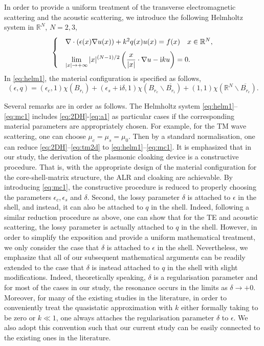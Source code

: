\documentclass[11pt,reqno,twoside]{amsart}
\theoremstyle{definition}
\theoremstyle{remark}
\numberwithin{equation}{section}
\begin{document}
In order to provide a uniform treatment of the transverse electromagnetic scattering and the acoustic scattering, we introduce the following Helmholtz system in $\mathbb{R}^N$, $N=2, 3$,
\begin{equation}\label{eq:helm1}
\begin{cases}
&\nabla\cdot(\epsilon(x)\nabla u(x))+k^2 q(x) u(x)=f(x)\quad x\in\mathbb{R}^N,\medskip\\
&\displaystyle{\lim_{|x|\rightarrow+\infty} |x|^{(N-1)/2}\left(\frac{x}{|x|}\cdot\nabla u-\mathrm{i} k u  \right)=0}.
\end{cases}
\end{equation}
In \eqref{eq:helm1}, the material configuration is specified as follows,
\begin{equation}\label{eq:mc1}
(\epsilon,q)=(\epsilon_c,1)\chi(B_{r_i})+(\epsilon_s+\mathrm{i}\delta, 1)\chi(B_{r_e}\backslash\overline{B_{r_i}})+(1, 1)\chi(\mathbb{R}^N\backslash\overline{B_{r_e}}).
\end{equation}

Several remarks are in order as follows. The Helmholtz system \eqref{eq:helm1}--\eqref{eq:mc1} includes \eqref{eq:2DH}-\eqref{eq:a1} as particular cases if the corresponding material parameters are appropriately chosen. For example, for the TM wave scattering, one can choose $\mu_c=\mu_s=\mu_0$. Then by a standard normalisation, one can reduce \eqref{eq:2DH}--\eqref{eq:tm2d} to \eqref{eq:helm1}--\eqref{eq:mc1}. It is emphasized that in our study, the derivation of the plasmonic cloaking device is a constructive procedure. That is, with the appropriate design of the material configuration for the core-shell-matrix structure, the ALR and cloaking are achievable. By introducing \eqref{eq:mc1}, the constructive procedure is reduced to properly choosing the parameters $\epsilon_c, \epsilon_s$ and $\delta$. Second, the lossy parameter $\delta$ is attached to $\epsilon$ in the shell, and instead, it can also be attached to $q$ in the shell. Indeed, following a similar reduction procedure as above, one can show that for the TE and acoustic scattering, the lossy parameter is actually attached to $q$ in the shell. However, in order to simplify the exposition and provide a uniform mathematical treatment, we only consider the case that $\delta$ is attached to $\epsilon$ in the shell. Nevertheless, we emphasize that all of our subsequent mathematical arguments can be readily extended to the case that $\delta$ is instead attached to $q$ in the shell with slight modifications. Indeed, theoretically speaking, $\delta$ is a regularisation parameter and for most of the cases in our study, the resonance occurs in the limits as $\delta\rightarrow+0$. Moreover, for many of the existing studies in the literature, in order to conveniently treat the quasistatic approximation with $k$ either formally taking to be zero or $k\ll 1$, one always attaches the regularisation parameter $\delta$ to $\epsilon$. We also adopt this convention such that our current study can be easily connected to the existing ones in the literature.
\end{document}
